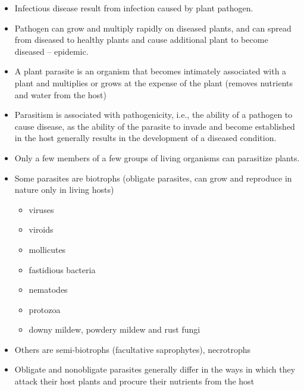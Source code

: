 \documentclass[11pt,dvipsnames,ignorenonframetext,aspectratio=169]{beamer}
\providecommand{\tightlist}{%
  \setlength{\itemsep}{0pt}\setlength{\parskip}{0pt}}
\begin{document}
\begin{frame}{}
\protect\hypertarget{section-8}{}
\begin{itemize}
\tightlist
\item
  Infectious disease result from infection caused by plant pathogen.
\item
  Pathogen can grow and multiply rapidly on diseased plants, and can
  spread from diseased to healthy plants and cause additional plant to
  become diseased -- epidemic.
\item
  A plant parasite is an organism that becomes intimately associated
  with a plant and multiplies or grows at the expense of the plant
  (removes nutrients and water from the host)
\item
  Parasitism is associated with pathogenicity, i.e., the ability of a
  pathogen to cause disease, as the ability of the parasite to invade
  and become established in the host generally results in the
  development of a diseased condition.
\end{itemize}
\end{frame}

\begin{frame}{}
\protect\hypertarget{section-9}{}
\begin{itemize}
\tightlist
\item
  Only a few members of a few groups of living organisms can parasitize
  plants.
\item
  Some parasites are biotrophs (obligate parasites, can grow and
  reproduce in nature only in living hosts)

  \begin{itemize}
  \tightlist
  \item
    viruses
  \item
    viroids
  \item
    mollicutes
  \item
    fastidious bacteria
  \item
    nematodes
  \item
    protozoa
  \item
    downy mildew, powdery mildew and rust fungi
  \end{itemize}
\item
  Others are semi-biotrophs (facultative saprophytes), necrotrophs
\item
  Obligate and nonobligate parasites generally differ in the ways in
  which they attack their host plants and procure their nutrients from
  the host
\end{itemize}
\end{frame}
\end{document}

